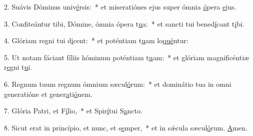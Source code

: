 2. Suávis Dóminus univ\uline{é}rsis:~* et miseratiónes ejus super ómnia \uline{ó}pera \uline{e}jus.\par 
3. Confiteántur tibi, Dómine, ómnia ópera t\uline{u}a:~* et sancti tui bened\uline{í}cant t\uline{i}bi.\par 
4. Glóriam regni tui d\uline{i}cent:~* et poténtiam t\uline{u}am lo\uline{qué}ntur:\par 
5. Ut notam fáciant fíliis hóminum poténtiam t\uline{u}am:~* et glóriam magnificéntiæ r\uline{e}gni t\uline{u}i.\par 
6. Regnum tuum regnum ómnium sæcul\uline{ó}rum:~* et dominátio tua in omni generatióne et gener\uline{a}ti\uline{ó}nem.\par 
7. Glória Patri, et F\uline{í}lio,~* et Spir\uline{í}tui S\uline{a}ncto.\par 
8. Sicut erat in princípio, et nunc, et s\uline{e}mper,~* et in sǽcula sæcul\uline{ó}rum. \uline{A}men.\par 
